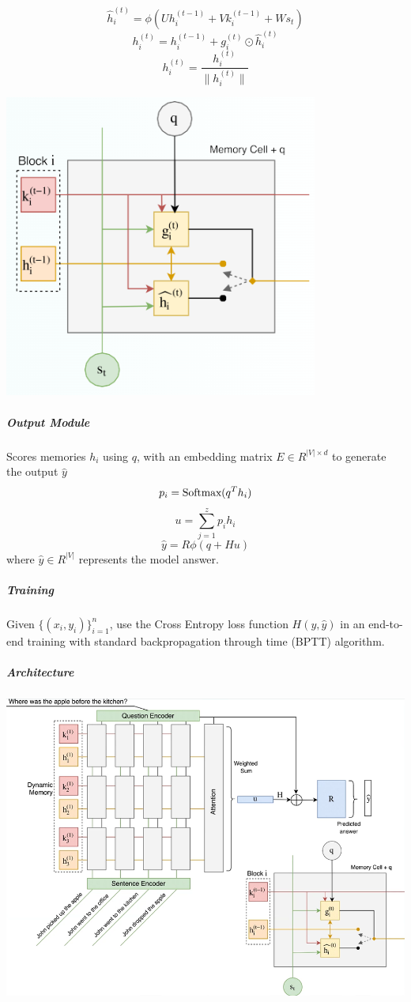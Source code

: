\documentclass[10pt]{report}
\begin{document}
$$\hat{h}_i^{(t)} = \phi(Uh_i^{(t-1)} + Vk_i^{(t-1)} + Ws_t)$$
$$h_i^{(t)} = h_i^{(t-1)} + g_i^{(t)}\odot\hat{h}_i^{(t)}$$
$$h_i^{(t)}= \frac{h_i^{(t)}}{\|h_i^{(t)}\|}$$
\begin{center}
	\includegraphics[scale=0.5]{99.png}
\end{center}
\subparagraph{Output Module} Scores memories $h_i$ using $q$, with an embedding matrix $E\in R^{|V|\times d}$ to generate the output $\hat{y}$
$$p_i = \hbox{Softmax}(q^Th_i)$$
$$u = \sum_{j=1}^z p_ih_i$$
$$\hat{y} = R\phi(q + Hu)$$
where $\hat{y}\in R^{|V|}$ represents the model answer.
\subparagraph{Training} Given $\{(x_i,y_i)\}_{i=1}^n$, use the Cross Entropy loss function $H(y,\hat{y})$ in an end-to-end training with standard backpropagation through time (BPTT) algorithm.
\subparagraph{Architecture}
\begin{center}
	\includegraphics[scale=0.5]{98.png}
\end{center}
\end{document}
